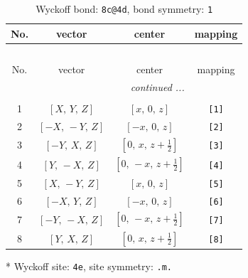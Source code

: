 \documentclass[fleqn,8pt]{jsarticle}
\begin{document}
\renewcommand{\arraystretch}{1.2}
\begin{longtable}{cccc}
\caption{Wyckoff bond: {\tt 8c@4d}, bond symmetry: {\tt 1}}
 \\
 \hline \hline
No. & vector & center & mapping \\ \hline \endfirsthead

\multicolumn{3}{l}{\tablename\ \thetable{}} \\
 \hline \hline
No. & vector & center & mapping \\ \hline \endhead

 \hline \hline
\multicolumn{3}{r}{\footnotesize\it continued ...} \\ \endfoot

 \hline \hline
\multicolumn{3}{r}{} \\ \endlastfoot

1 & $\left[ X,\, Y,\, Z \right]$ & $\left[ x,\, 0,\, z \right]$ & {\tt [1]} \\ \hline
2 & $\left[ - X,\, - Y,\, Z \right]$ & $\left[ - x,\, 0,\, z \right]$ & {\tt [2]} \\ \hline
3 & $\left[ - Y,\, X,\, Z \right]$ & $\left[ 0,\, x,\, z + \frac{1}{2} \right]$ & {\tt [3]} \\ \hline
4 & $\left[ Y,\, - X,\, Z \right]$ & $\left[ 0,\, - x,\, z + \frac{1}{2} \right]$ & {\tt [4]} \\ \hline
5 & $\left[ X,\, - Y,\, Z \right]$ & $\left[ x,\, 0,\, z \right]$ & {\tt [5]} \\ \hline
6 & $\left[ - X,\, Y,\, Z \right]$ & $\left[ - x,\, 0,\, z \right]$ & {\tt [6]} \\ \hline
7 & $\left[ - Y,\, - X,\, Z \right]$ & $\left[ 0,\, - x,\, z + \frac{1}{2} \right]$ & {\tt [7]} \\ \hline
8 & $\left[ Y,\, X,\, Z \right]$ & $\left[ 0,\, x,\, z + \frac{1}{2} \right]$ & {\tt [8]} \\
\end{longtable}
* Wyckoff site: {\tt 4e}, site symmetry: {\tt .m.}
\renewcommand{\arraystretch}{1.2}
\end{document}
